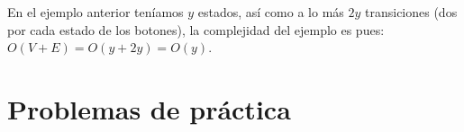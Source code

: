 En el ejemplo anterior teníamos \(y\) estados, así como a lo más \(2y\) transiciones (dos por cada estado de los botones), la complejidad del ejemplo es pues: \(O(V+E)=O(y+2y)=O(y)\).

\section*{Problemas de práctica}

\begin{exercise}
\end{exercise}

\begin{exercise}
\end{exercise}

\begin{exercise}
\end{exercise}
